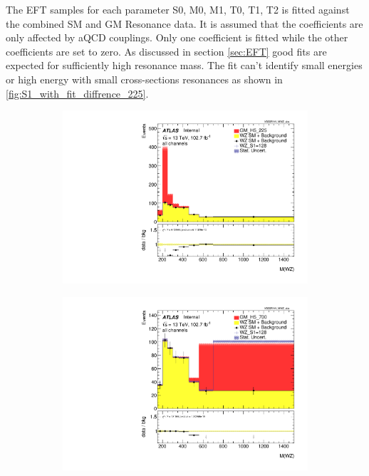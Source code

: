 \documentclass[../Bachelorarbeit.tex]{subfiles}
\begin{document}
The EFT samples for each parameter S0, M0, M1, T0, T1, T2 is fitted against the combined SM and GM Resonance data. It is assumed that the coefficients are only affected by aQCD couplings.
Only one coefficient is fitted while the other coefficients are set to zero. As discussed in section \ref{sec:EFT} good fits are expected for sufficiently high resonance mass.
The fit can't identify small energies or high energy with small cross-sections resonances as shown in \ref{fig:S1_with_fit_diffrence_225}.

\begin{figure}[h]
    \centering
    \begin{subfigure}{0.3\textwidth}
        \includegraphics[width=\textwidth]{Plots/operators/all_VV_MTWZ_vbs_225.pdf}
        \caption{}
    \end{subfigure}
    \begin{subfigure}{0.3\textwidth}
        \includegraphics[width=\textwidth]{Plots/operators/all_VV_MTWZ_vbs_700.pdf}

\end{subfigure}
\end{figure}
\end{document}
